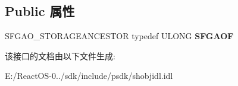\subsection*{Public 属性}
\begin{DoxyCompactItemize}
\item 
\mbox{\label{interface_i_shell_folder_ac37df1dde378a059ef49f5c21681ec92}} 
S\+F\+G\+A\+O\+\_\+\+S\+T\+O\+R\+A\+G\+E\+A\+N\+C\+E\+S\+T\+OR typedef U\+L\+O\+NG {\bfseries S\+F\+G\+A\+OF}
\end{DoxyCompactItemize}


该接口的文档由以下文件生成\+:\begin{DoxyCompactItemize}
\item 
E\+:/\+React\+O\+S-\/0../sdk/include/psdk/shobjidl.\+idl\end{DoxyCompactItemize}
